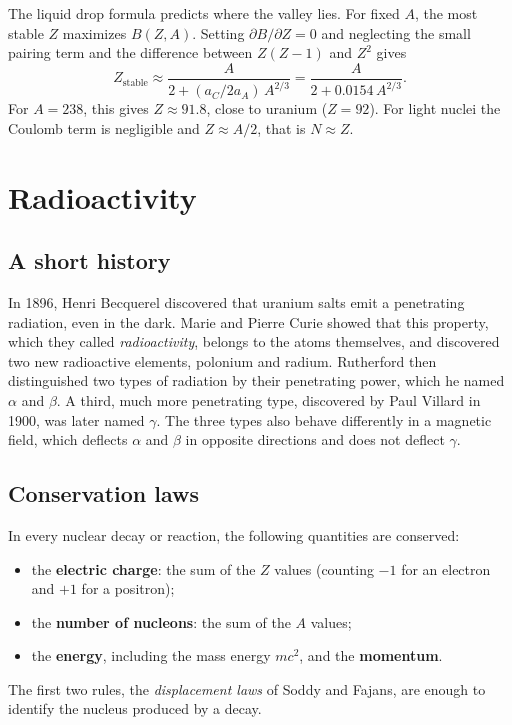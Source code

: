 \documentclass[11pt,a4paper]{article}
\begin{document}
\begin{furtherbox}
The liquid drop formula predicts where the valley lies. For fixed $A$, the most stable $Z$ maximizes $B(Z,A)$. Setting $\partial B/\partial Z = 0$ and neglecting the small pairing term and the difference between $Z(Z-1)$ and $Z^2$ gives
\[
Z_{\text{stable}} \approx \frac{A}{2 + (a_C/2a_A)\,A^{2/3}} = \frac{A}{2 + 0.0154\,A^{2/3}}.
\]
For $A = 238$, this gives $Z \approx 91.8$, close to uranium ($Z=92$). For light nuclei the Coulomb term is negligible and $Z \approx A/2$, that is $N \approx Z$.
\end{furtherbox}

\section{Radioactivity}

\subsection{A short history}

In 1896, Henri Becquerel discovered that uranium salts emit a penetrating radiation, even in the dark. Marie and Pierre Curie showed that this property, which they called \emph{radioactivity}, belongs to the atoms themselves, and discovered two new radioactive elements, polonium and radium. Rutherford then distinguished two types of radiation by their penetrating power, which he named $\alpha$ and $\beta$. A third, much more penetrating type, discovered by Paul Villard in 1900, was later named $\gamma$. The three types also behave differently in a magnetic field, which deflects $\alpha$ and $\beta$ in opposite directions and does not deflect $\gamma$.

\subsection{Conservation laws}

In every nuclear decay or reaction, the following quantities are conserved:
\begin{itemize}
  \item the \textbf{electric charge}: the sum of the $Z$ values (counting $-1$ for an electron and $+1$ for a positron);
  \item the \textbf{number of nucleons}: the sum of the $A$ values;
  \item the \textbf{energy}, including the mass energy $mc^2$, and the \textbf{momentum}.
\end{itemize}
The first two rules, the \emph{displacement laws} of Soddy and Fajans, are enough to identify the nucleus produced by a decay.
\end{document}
